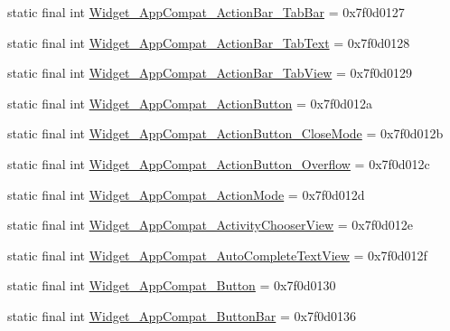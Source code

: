 \begin{DoxyCompactItemize}
\item 
static final int \mbox{\hyperlink{classandroid_1_1support_1_1v7_1_1appcompat_1_1_r_1_1style_a631483194eb7110b33fa5158287a2e5d}{Widget\+\_\+\+App\+Compat\+\_\+\+Action\+Bar\+\_\+\+Tab\+Bar}} = 0x7f0d0127
\item 
static final int \mbox{\hyperlink{classandroid_1_1support_1_1v7_1_1appcompat_1_1_r_1_1style_a577669ac1cf782a721001fe744374741}{Widget\+\_\+\+App\+Compat\+\_\+\+Action\+Bar\+\_\+\+Tab\+Text}} = 0x7f0d0128
\item 
static final int \mbox{\hyperlink{classandroid_1_1support_1_1v7_1_1appcompat_1_1_r_1_1style_a22b55f7cb4073c4b1890d22d27af414b}{Widget\+\_\+\+App\+Compat\+\_\+\+Action\+Bar\+\_\+\+Tab\+View}} = 0x7f0d0129
\item 
static final int \mbox{\hyperlink{classandroid_1_1support_1_1v7_1_1appcompat_1_1_r_1_1style_a604fa2bfad530b840478f9ca70decb84}{Widget\+\_\+\+App\+Compat\+\_\+\+Action\+Button}} = 0x7f0d012a
\item 
static final int \mbox{\hyperlink{classandroid_1_1support_1_1v7_1_1appcompat_1_1_r_1_1style_acffc9b830cdc90b6caf36cbc82f002a2}{Widget\+\_\+\+App\+Compat\+\_\+\+Action\+Button\+\_\+\+Close\+Mode}} = 0x7f0d012b
\item 
static final int \mbox{\hyperlink{classandroid_1_1support_1_1v7_1_1appcompat_1_1_r_1_1style_a0b2c92644f2e6ec3ad85613e11f9c80c}{Widget\+\_\+\+App\+Compat\+\_\+\+Action\+Button\+\_\+\+Overflow}} = 0x7f0d012c
\item 
static final int \mbox{\hyperlink{classandroid_1_1support_1_1v7_1_1appcompat_1_1_r_1_1style_ab558061ee2c1f9685ea9b614eaa9808a}{Widget\+\_\+\+App\+Compat\+\_\+\+Action\+Mode}} = 0x7f0d012d
\item 
static final int \mbox{\hyperlink{classandroid_1_1support_1_1v7_1_1appcompat_1_1_r_1_1style_a798d9542c79456837c27af4af31d41a4}{Widget\+\_\+\+App\+Compat\+\_\+\+Activity\+Chooser\+View}} = 0x7f0d012e
\item 
static final int \mbox{\hyperlink{classandroid_1_1support_1_1v7_1_1appcompat_1_1_r_1_1style_ae0db3ec24d96627ddd823d9513596e91}{Widget\+\_\+\+App\+Compat\+\_\+\+Auto\+Complete\+Text\+View}} = 0x7f0d012f
\item 
static final int \mbox{\hyperlink{classandroid_1_1support_1_1v7_1_1appcompat_1_1_r_1_1style_a972eb28b6630bea576e5da76a6c71e87}{Widget\+\_\+\+App\+Compat\+\_\+\+Button}} = 0x7f0d0130
\item 
static final int \mbox{\hyperlink{classandroid_1_1support_1_1v7_1_1appcompat_1_1_r_1_1style_a35ffe2c992c94dbfdd7b31694e76fa29}{Widget\+\_\+\+App\+Compat\+\_\+\+Button\+Bar}} = 0x7f0d0136

\end{DoxyCompactItemize}
